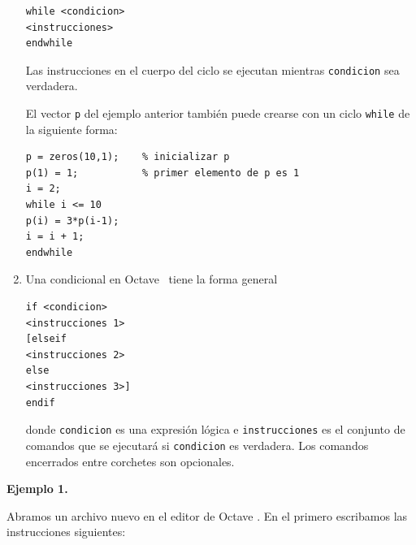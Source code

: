 \documentclass[letter,11pt]{article}
\newcommand\0{\mathbf{0}}
\newcommand{\octave}{{\sc Octave }}
\begin{document}
\begin{enumerate}
\medskip

\begin{lstlisting}		
while <condicion>
<instrucciones>
endwhile
\end{lstlisting}

\medskip

\noindent Las instrucciones en el cuerpo del ciclo se ejecutan mientras
\Verb+condicion+ sea verdadera.

%
%
% 				

\noindent El vector \verb+p+ del ejemplo anterior tambi\'en puede crearse con un ciclo \verb+while+
de la siguiente forma:

\medskip

\begin{lstlisting}
p = zeros(10,1);    % inicializar p
p(1) = 1;           % primer elemento de p es 1
i = 2;
while i <= 10
p(i) = 3*p(i-1);
i = i + 1;
endwhile
\end{lstlisting}

\medskip

\item Una condicional en \octave\, tiene la forma general

\medskip

\begin{lstlisting}		
if <condicion>
<instrucciones 1>
[elseif
<instrucciones 2>
else
<instrucciones 3>]
endif			
\end{lstlisting}				

\medskip

\noindent donde \Verb+condicion+ es una expresi\'on l\'ogica e
\Verb+instrucciones+ es el conjunto de comandos que se
ejecutar\'a si \Verb+condicion+ es verdadera. Los comandos encerrados
entre corchetes son opcionales.

\end{enumerate}	

\textbf{Ejemplo 1.}

Abramos un archivo nuevo en el editor de \octave. En el primero escribamos las instrucciones siguientes:
	
\end{document}
